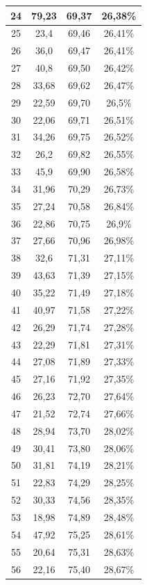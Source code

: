 \begin{longtable}{|c|c|c|c|}
	24 & 79,23 & 69,37 & 26,38\% \\ \hline
	25 & 23,4 & 69,46 & 26,41\% \\ \hline
	26 & 36,0 & 69,47 & 26,41\% \\ \hline
	27 & 40,8 & 69,50 & 26,42\% \\ \hline
	28 & 33,68 & 69,62 & 26,47\% \\ \hline
	29 & 22,59 & 69,70 & 26,5\% \\ \hline
	30 & 22,06 & 69,71 & 26,51\% \\ \hline
	31 & 34,26 & 69,75 & 26,52\% \\ \hline
	32 & 26,2 & 69,82 & 26,55\% \\ \hline
	33 & 45,9 & 69,90 & 26,58\% \\ \hline
	34 & 31,96 & 70,29 & 26,73\% \\ \hline
	35 & 27,24 & 70,58 & 26,84\% \\ \hline
	36 & 22,86 & 70,75 & 26,9\% \\ \hline
	37 & 27,66 & 70,96 & 26,98\% \\ \hline
	38 & 32,6 & 71,31 & 27,11\% \\ \hline
	39 & 43,63 & 71,39 & 27,15\% \\ \hline
	40 & 35,22 & 71,49 & 27,18\% \\ \hline
	41 & 40,97 & 71,58 & 27,22\% \\ \hline
	42 & 26,29 & 71,74 & 27,28\% \\ \hline
	43 & 22,29 & 71,81 & 27,31\% \\ \hline
	44 & 27,08 & 71,89 & 27,33\% \\ \hline
	45 & 27,16 & 71,92 & 27,35\% \\ \hline
	46 & 26,23 & 72,70 & 27,64\% \\ \hline
	47 & 21,52 & 72,74 & 27,66\% \\ \hline
	48 & 28,94 & 73,70 & 28,02\% \\ \hline
	49 & 30,41 & 73,80 & 28,06\% \\ \hline
	50 & 31,81 & 74,19 & 28,21\% \\ \hline
	51 & 22,83 & 74,29 & 28,25\% \\ \hline
	52 & 30,33 & 74,56 & 28,35\% \\ \hline
	53 & 18,98 & 74,89 & 28,48\% \\ \hline
	54 & 47,92 & 75,25 & 28,61\% \\ \hline
	55 & 20,64 & 75,31 & 28,63\% \\ \hline
	56 & 22,16 & 75,40 & 28,67\% \\ \hline

\end{longtable}
